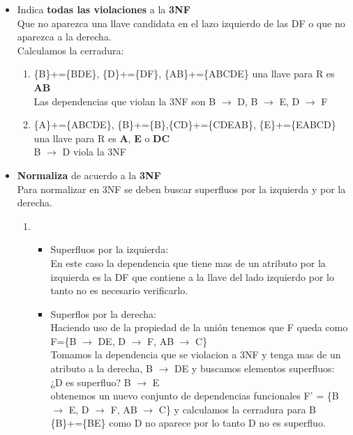\documentclass{article}
\begin{document}
\begin{enumerate}
   \begin{itemize}
   	\item Indica \textbf{todas las violaciones } a la \textbf{3NF}\\
   	Que no aparezca una llave candidata en el lazo izquierdo de las DF o que no aparezca a la derecha.\\
   	Calculamos la cerradura:\\
   	\begin{enumerate}
   		\item \{B\}+=\{BDE\}, \{D\}+=\{DF\}, \{AB\}+=\{ABCDE\} una llave para R es \textbf{AB}\\ Las dependencias que violan la 3NF son  B $\rightarrow$ D, B $\rightarrow$ E, D $\rightarrow$ F
   	    \item \{A\}+=\{ABCDE\}, \{B\}+=\{B\},\{CD\}+=\{CDEAB\}, \{E\}+=\{EABCD\} una llave para R es \textbf{A}, \textbf{E} o \textbf{DC}\\ B $\rightarrow$ D viola la 3NF
   	\end{enumerate}
   	\item \textbf{Normaliza} de acuerdo a la \textbf{3NF}\\
   	Para normalizar en 3NF se deben buscar superfluos por la izquierda y por la derecha.
   	\begin{enumerate}
   		\item \begin{itemize}
   			\item Superfluos por la izquierda:\\
   			En este caso la dependencia que tiene mas de un atributo por la izquierda es la DF que contiene a la llave del lado izquierdo por lo tanto no es necesario verificarlo.\\
   			\item Superflos por la derecha:\\
   			Haciendo uso de la propiedad de la unión tenemos que F queda como F=\{B $\rightarrow$ DE, D $\rightarrow$ F, AB $\rightarrow$ C\}\\
   			Tomamos la dependencia que se violacion a 3NF y tenga mas de un atributo a la derecha, B $\rightarrow$ DE y buscamos elementos superfluos:\\
   			¿D es superfluo? B $\rightarrow$ E\\
   			obtenemos un nuevo conjunto de dependencias funcionales F' = \{B $\rightarrow$ E, D $\rightarrow$ F, AB $\rightarrow$ C\} y calculamos la cerradura para B\\
   			\{B\}+=\{BE\} como D no aparece por lo tanto D no es superfluo.\\
   			

\end{itemize}
\end{enumerate}
\end{itemize}
\end{enumerate}
\end{document}

